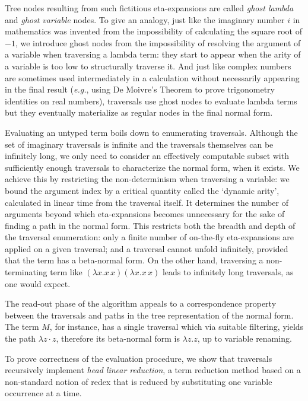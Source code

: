 \documentclass{elsarticle}
\makeatletter
\theoremstyle{plain}
\theoremstyle{definition}
\renewcommand\eg{{\it e.g.\@\xspace}}
\makeatother
\begin{document}
Tree nodes resulting from such fictitious eta-expansions
are called  \emph{ghost lambda} and \emph{ghost variable} nodes.
To give an analogy, just like the imaginary number $i$ in mathematics was invented from the impossibility of calculating the square root of $-1$, we introduce ghost nodes from the impossibility of resolving the argument of a variable when traversing a lambda term: they start to appear when the arity of a variable is too low to structurally traverse it.
And just like complex numbers are sometimes used intermediately in a calculation without necessarily appearing in the final result (\eg, using De Moivre's Theorem to prove trigonometry identities on real numbers),
traversals use ghost nodes to evaluate lambda terms but they eventually materialize as regular nodes in the final normal form.

Evaluating an untyped term boils down to enumerating traversals.
 Although the set of imaginary traversals is infinite and the traversals  themselves can be infinitely long, we only need to consider an effectively computable subset with sufficiently enough traversals to characterize the normal form, when it exists.
We achieve this by restricting the non-determinism when traversing a variable: we bound the argument index by a critical quantity called the `dynamic arity', calculated in linear time from the traversal itself. It determines the number of arguments beyond which eta-expansions becomes unnecessary for the sake of finding a path in the normal form. This restricts both the breadth and depth of the traversal enumeration: only a finite number of on-the-fly eta-expansions are applied on a given traversal; and a traversal cannot unfold infinitely, provided that the term has a beta-normal form.
On the other hand, traversing a non-terminating term like $(\lambda x. x\,x)(\lambda x. x\,x)$ leads to infinitely long traversals, as one would expect.

The read-out phase of the algorithm appeals to a correspondence property between the traversals and paths in the tree representation of the normal form. The term $M$, for instance, has a single traversal which via suitable filtering, yields the path $\lambda z \cdot z$, therefore its beta-normal form is $\lambda z. z$, up to variable renaming.

 To prove correctness of the evaluation procedure, we show that traversals recursively implement \emph{head linear reduction}, a term reduction method
 based on a non-standard notion of redex that is reduced
 by substituting one variable occurrence at a time.
\end{document}
